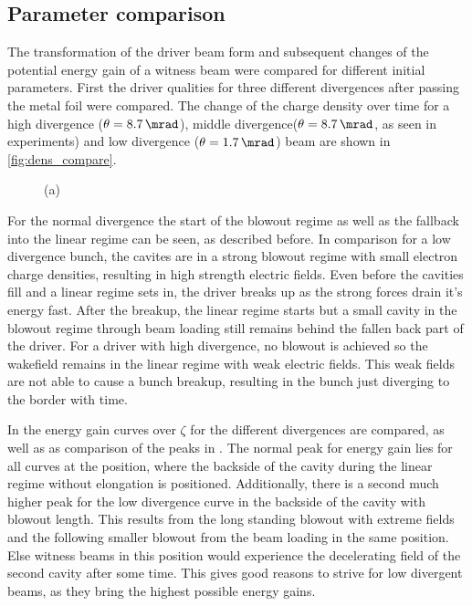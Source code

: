 \documentclass[bachelor_thesis]{subfiles}
\begin{document}
\subsection{Parameter comparison}
The transformation of the driver beam form and subsequent changes of the potential energy gain of a witness beam were compared for different initial parameters.
First the driver qualities for three different divergences after passing the metal foil were compared. The change of the charge density over time
for a high divergence ($\theta=\qty{8.7}{\mrad}$), middle divergence($\theta=\qty{8.7}{\mrad}$, as seen in experiments) and low divergence ($\theta=\qty{1.7}{\mrad}$) beam are shown in \autoref{fig:dens_compare}.
\begin{figure}
	\centering
	\begin{subfigure}{0.5\textwidth}
	\centering
	\missingfigure{}
	\caption{} \label{fig:dens_low}
	\end{subfigure}
	\hfill
	\begin{subfigure}{0.5\textwidth}
	\centering
	\missingfigure{}
	\caption{} \label{fig:dens_high}
	\end{subfigure}
	\caption{(a) }
	\label{fig:dens_compare}
\end{figure}
For the normal divergence the start of the blowout regime as well as the fallback into the linear regime can be seen, as described before.
In comparison for a low divergence bunch, the cavites are in a strong blowout regime with small electron charge densities, resulting in high strength electric fields. Even before the cavities fill and a linear regime sets in, the driver breaks up
as the strong forces drain it's energy fast. After the breakup, the linear regime starts but a small cavity in the blowout regime through beam loading still remains behind the fallen back part of the driver.
For a driver with high divergence, no blowout is achieved so the wakefield remains in the linear regime with weak electric fields. This weak fields are not able to cause a bunch breakup, resulting in the bunch just diverging to the border with time.

In  the energy gain curves over $\zeta$ for the different divergences are compared, as well as as comparison of the peaks in .
The normal peak for energy gain lies for all curves at the position, where the backside of the cavity during the linear regime without elongation is positioned. Additionally, there is a second much higher peak for the low divergence curve
in the backside of the cavity with blowout length. This results from the long standing blowout with extreme fields and the following smaller blowout from the beam loading in the same position. Else witness beams in this position would experience the decelerating
field of the second cavity after some time. This gives good reasons to strive for low divergent beams, as they bring the highest possible energy gains.
\end{document}
